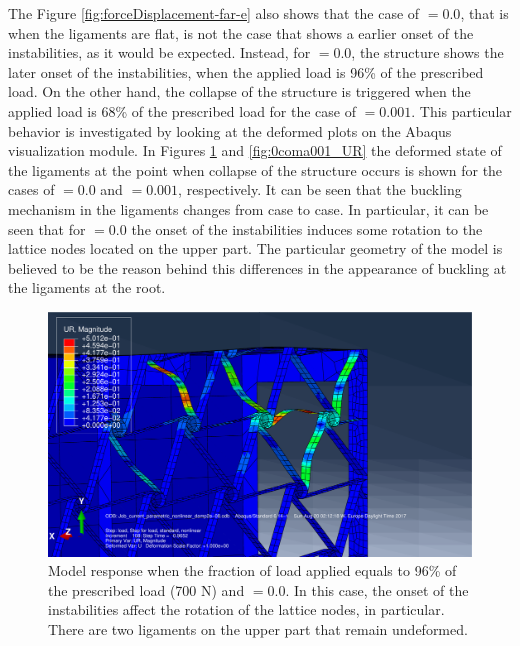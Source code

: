       The Figure \ref{fig:forceDisplacement-far-e} also shows that the case of \chie$ = 0.0$, that is when the ligaments are flat, is not the case that shows a earlier onset of the instabilities, as it would be expected. Instead, for \chie$ = 0.0$, the structure shows the later onset of the instabilities, when the applied load is 96\% of the prescribed load. On the other hand, the collapse of the structure is triggered when the applied load is 68\% of the prescribed load for the case of \chie$ = 0.001$. This particular behavior is investigated by looking at the deformed plots on the Abaqus visualization module. In Figures \ref{fig:0coma0_UR} and \ref{fig:0coma001_UR} the deformed state of the ligaments at the point when collapse of the structure occurs is shown for the cases of \chie$ = 0.0$ and \chie$ = 0.001$, respectively. It can be seen that the buckling mechanism in the ligaments changes from case to case. In particular, it can be seen that for \chie$ = 0.0$ the onset of the instabilities induces some rotation to the lattice nodes located on the upper part. The particular geometry of the model is believed to be the reason behind this differences in the appearance of buckling at the ligaments at the root. 

      \begin{figure}[!htpb] %
        \centering
        \includegraphics[width=0.7 \textwidth]{figures/../figures/result-sim/eccen/0coma0_UR}
        \caption[Model response when the fraction of load applied equals to 96\% of the prescribed load (700 N) and \chie$= 0.0$]{Model response when the fraction of load applied equals to 96\% of the prescribed load (700 N) and \chie$= 0.0$. In this case, the onset of the instabilities affect the rotation of the lattice nodes, in particular. There are two ligaments on the upper part that remain undeformed.}
        \label{fig:0coma0_UR}
      \end{figure}

